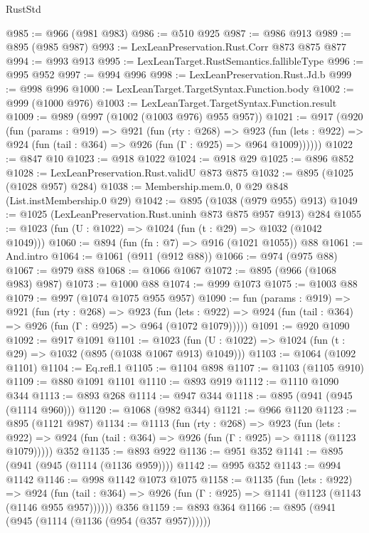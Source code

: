 \begin{lexlean}{RustStd}
\begin{coremodule}
@985 := @966 (@981 @983)
@986 := @510 @925
@987 := @986 @913
@989 := @895 (@985 @987)
@993 := LexLeanPreservation.Rust.Corr @873 @875 @877
@994 := @993 @913
@995 := LexLeanTarget.RustSemantics.fallibleType
@996 := @995 @952
@997 := @994 @996
@998 := LexLeanPreservation.Rust.Jd.b
@999 := @998 @996
@1000 := LexLeanTarget.TargetSyntax.Function.body
@1002 := @999 (@1000 @976)
@1003 := LexLeanTarget.TargetSyntax.Function.result
@1009 := @989 (@997 (@1002 (@1003 @976) @955 @957))
@1021 := @917
    (@920
      (fun (params : @919) =>
      @921
        (fun (rty : @268) =>
        @923
          (fun (lets : @922) => @924 (fun (tail : @364) => @926 (fun (Γ : @925) => @964 @1009))))))
@1022 := @847 @10
@1023 := @918 @1022
@1024 := @918 @29
@1025 := @896 @852
@1028 := LexLeanPreservation.Rust.validU @873 @875
@1032 := @895 (@1025 (@1028 @957) @284)
@1038 := Membership.mem.{0, 0} @29 @848 (List.instMembership.{0} @29)
@1042 := @895 (@1038 (@979 @955) @913)
@1049 := @1025 (LexLeanPreservation.Rust.uninh @873 @875 @957 @913) @284
@1055 := @1023 (fun (U : @1022) => @1024 (fun (t : @29) => @1032 (@1042 @1049)))
@1060 := @894 (fun (fn : @7) => @916 (@1021 @1055)) @88
@1061 := And.intro
@1064 := @1061 (@911 (@912 @88))
@1066 := @974 (@975 @88)
@1067 := @979 @88
@1068 := @1066 @1067
@1072 := @895 (@966 (@1068 @983) @987)
@1073 := @1000 @88
@1074 := @999 @1073
@1075 := @1003 @88
@1079 := @997 (@1074 @1075 @955 @957)
@1090 := fun (params : @919) =>
  @921
    (fun (rty : @268) =>
    @923
      (fun (lets : @922) =>
      @924 (fun (tail : @364) => @926 (fun (Γ : @925) => @964 (@1072 @1079)))))
@1091 := @920 @1090
@1092 := @917 @1091
@1101 := @1023 (fun (U : @1022) => @1024 (fun (t : @29) => @1032 (@895 (@1038 @1067 @913) @1049)))
@1103 := @1064 (@1092 @1101)
@1104 := Eq.refl.{1}
@1105 := @1104 @898
@1107 := @1103 (@1105 @910)
@1109 := @880 @1091 @1101
@1110 := @893 @919
@1112 := @1110 @1090 @344
@1113 := @893 @268
@1114 := @947 @344
@1118 := @895 (@941 (@945 (@1114 @960)))
@1120 := @1068 (@982 @344)
@1121 := @966 @1120
@1123 := @895 (@1121 @987)
@1134 := @1113
    (fun (rty : @268) =>
    @923
      (fun (lets : @922) =>
      @924 (fun (tail : @364) => @926 (fun (Γ : @925) => @1118 (@1123 @1079)))))
    @352
@1135 := @893 @922
@1136 := @951 @352
@1141 := @895 (@941 (@945 (@1114 (@1136 @959))))
@1142 := @995 @352
@1143 := @994 @1142
@1146 := @998 @1142 @1073 @1075
@1158 := @1135
    (fun (lets : @922) =>
    @924 (fun (tail : @364) => @926 (fun (Γ : @925) => @1141 (@1123 (@1143 (@1146 @955 @957))))))
    @356
@1159 := @893 @364
@1166 := @895 (@941 (@945 (@1114 (@1136 (@954 (@357 @957))))))

\end{coremodule}
\end{lexlean}
